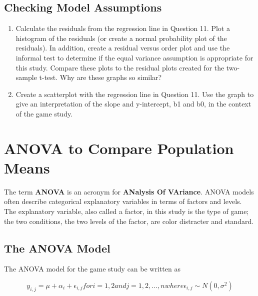 \documentclass[
]{report}
\begin{document}
\hypertarget{checking-model-assumptions}{%
\subsection*{Checking Model Assumptions}\label{checking-model-assumptions}}

\begin{enumerate}
\def\labelenumi{\arabic{enumi}.}
\setcounter{enumi}{13}
\item
  Calculate the residuals from the regression line in Question 11. Plot a histogram of the residuals (or create a normal probability plot of the residuals). In addition, create a residual versus order plot and use the informal test to determine if the equal variance assumption is appropriate for this study. Compare these plots to the residual plots created for the two-sample t-test. Why are these graphs so similar?
\item
  Create a scatterplot with the regression line in Question 11. Use the graph to give an interpretation of the slope and y-intercept, b1 and b0, in the context of the game study.
\end{enumerate}

\newpage

\hypertarget{anova-to-compare-population-means}{%
\section{ANOVA to Compare Population Means}\label{anova-to-compare-population-means}}

The term \textbf{ANOVA} is an acronym for \textbf{ANalysis Of VAriance}. ANOVA models often describe categorical explanatory variables in terms of factors and levels. The explanatory variable, also called a factor, in
this study is the type of game; the two conditions, the two levels of the factor, are color distracter and standard.

\hypertarget{the-anova-model}{%
\subsection{The ANOVA Model}\label{the-anova-model}}

The ANOVA model for the game study can be written as

\begin{equation}
\label{2.6} y_{i,j} = \mu + \alpha_i + \epsilon_{i,j} for i = 1, 2 and j = 1, 2, ... , n where \epsilon_{i,j} \sim N(0,\sigma^2) \tag{2.6}
\end{equation}
\end{document}
